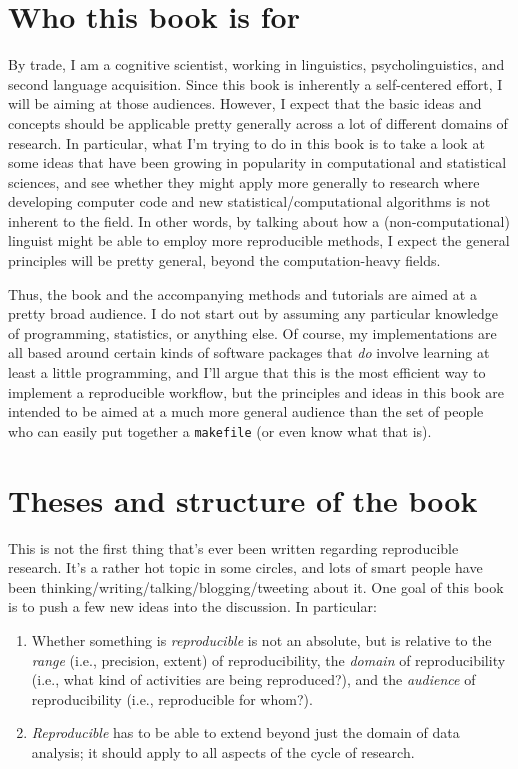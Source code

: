 \documentclass{book}
\begin{document}
\section{Who this book is for}
\label{sec-1-4}

By trade, I am a cognitive scientist, working in linguistics, psycholinguistics, and second language acquisition. Since this book is inherently a self-centered effort, I will be aiming at those audiences. However, I expect that the basic ideas and concepts should be applicable pretty generally across a lot of different domains of research. In particular, what I'm trying to do in this book is to take a look at some ideas that have been growing in popularity in computational and statistical sciences, and see whether they might apply more generally to research where developing computer code and new statistical/computational algorithms is not inherent to the field. In other words, by talking about how a (non-computational) linguist might be able to employ more reproducible methods, I expect the general principles will be pretty general, beyond the computation-heavy fields.

Thus, the book and the accompanying methods and tutorials are aimed at a pretty broad audience. I do not start out by assuming any particular knowledge of programming, statistics, or anything else. Of course, my implementations are all based around certain kinds of software packages that \emph{do} involve learning at least a little programming, and I'll argue that this is the most efficient way to implement a reproducible workflow, but the principles and ideas in this book are intended to be aimed at a much more general audience than the set of people who can easily put together a \texttt{makefile} (or even know what that is).
\section{Theses and structure of the book}
\label{sec-1-5}

This is not the first thing that's ever been written regarding reproducible research. It's a rather hot topic in some circles, and lots of smart people have been thinking/writing/talking/blogging/tweeting about it. One goal of this book is to push a few new ideas into the discussion. In particular:

\begin{enumerate}
\item Whether something is \emph{reproducible} is not an absolute, but is relative to the \emph{range} (i.e., precision, extent) of reproducibility, the \emph{domain} of reproducibility (i.e., what kind of activities are being reproduced?), and the \emph{audience} of reproducibility (i.e., reproducible for whom?).
\item \emph{Reproducible} has to be able to extend beyond just the domain of data analysis; it should apply to all aspects of the cycle of research.
\end{enumerate}
\end{document}

